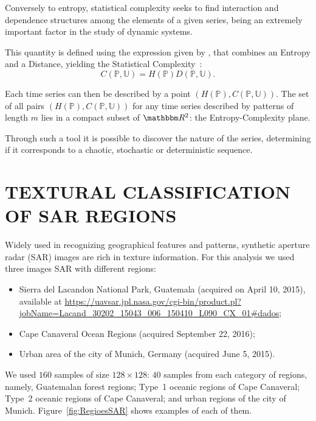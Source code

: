 \documentclass{isprs}
\begin{document}
Conversely to entropy, statistical complexity seeks to find interaction and dependence structures among the elements of a given series, being an extremely important factor in the study of dynamic systems.

This quantity is defined using the expression given by \citet{Lopez1995statistical}, 
that combines an Entropy and a Distance, yielding the Statistical Complexity~\citep{Feldman2008information,Feldman1998Statistical}:
\begin{equation}
C(\mathbb{P}, \mathbb{U}) = H(\mathbb{P}) D(\mathbb{P}, \mathbb{U}).
\end{equation}

Each time series can then be described by a point $(H(\mathbb{P}), C(\mathbb{P}, \mathbb{U}))$.
The set of all pairs $(H(\mathbb{P}), C(\mathbb{P}, \mathbb{U}))$ for any time series described by patterns of length $m$ lies in a compact subset of $\mathbbm R^2$: the Entropy-Complexity plane. 

Through such a tool it is possible to discover the nature of the series, determining if it corresponds to a chaotic, stochastic or deterministic sequence.

\section{TEXTURAL CLASSIFICATION OF SAR REGIONS}\label{SAR}

Widely used in recognizing geographical features and patterns, synthetic aperture radar (SAR) images are rich in texture information. 
For this analysis we used three images SAR with different regions:
\begin{itemize}
	\item Sierra del Lacandon National Park, Guatemala (acquired on April 10, 2015), available at \url{https://uavsar.jpl.nasa.gov/cgi-bin/product.pl?jobName=Lacand_30202_15043_006_150410_L090_CX_01#dados};
	\item Cape Canaveral Ocean Regions (acquired September 22, 2016);
	\item Urban area of the city of Munich, Germany (acquired June 5, 2015).
\end{itemize}

We used $160$ samples of size $128\times128$: $40$ samples from each category of regions, namely,
Guatemalan forest regions; 
Type~1 oceanic regions of Cape Canaveral; 
Type~2 oceanic regions of Cape Canaveral; and 
urban regions of the city of Munich. 
Figure~\ref{fig:RegioesSAR} shows examples of each of them.
\end{document}
